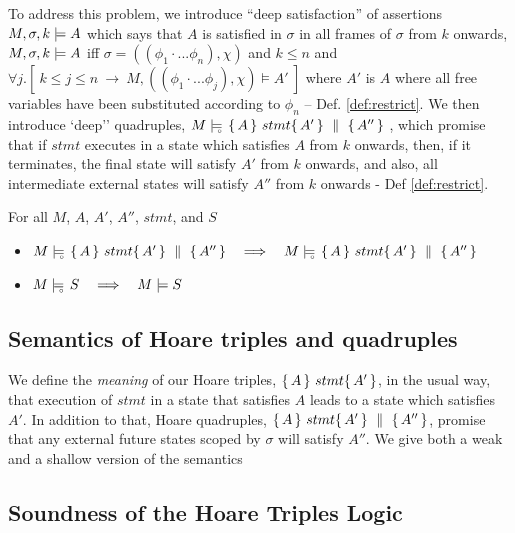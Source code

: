 To address this problem, we introduce ``deep satisfaction'' of assertions $ M,\sigma ,{k} \models {A} $ which says that $A$ is satisfied in $\sigma$  in all frames of $\sigma$ from $k$ onwards, 
\ie  $ M,\sigma ,{k} \models {A} $ iff $\sigma = ((\phi_1\cdot ... \phi_n), \chi)$ and $k\leq n$ and $\forall j. [\  k\leq j \leq n \ \rightarrow \ M, ((\phi_1\cdot ... \phi_j), \chi) \models A'\ ]$ where $A'$ is $A$ where all free variables have been substituted according to $\phi_n$ --
\cf Def. \ref{def:restrict}.
We then introduce `deep'' quadruples,   $M \models\!\!\!\!_{_{\circ}}\   \{\, A \, \}\ stmt \{\, A' \, \} \, \,\parallel\,\, \{\, A'' \, \} $ , which promise that if $stmt$ executes in a state which satisfies $A$ from $k$ onwards, then, if it terminates, the final state will satisfy $A'$ from $k$ onwards, and also, all intermediate external states will satisfy $A''$ from $k$ onwards - \cf Def \ref{def:restrict}.

\begin{lemma}
For all $M$, $A$, $A'$, $A''$, $stmt$, and $S$
\begin{itemize}
\item
 $\satisfiesD {M} {\quadruple  {A} }   {stmt}   {A'} {A''}   \ \ \ \Longrightarrow \ \ \   \satisfiesD {M} {\quadruple  {A} }   {stmt}   {A'} {A''}$
\item 
$\satisfiesD {M} {S}  \ \ \ \Longrightarrow \ \ \ \satisfies {M} {S}$
\end{itemize}
\end{lemma}



\subsection{Semantics of Hoare triples and quadruples}
\label{sect:HLmeans}

We  define the {\emph {meaning}} of  our Hoare triples, $ \{\, A \, \}\ stmt \{\, A' \, \}$,  in the usual way, \ie that execution of $stmt$ in a state that satisfies $A$ leads to a state which satisfies $A'$.  
In addition to that, Hoare quadruples, $ \{\, A \, \}\ stmt \{\, A' \, \} \, \,\parallel\,\, \{\, A'' \, \} $, promise that any external future states scoped by $\sigma$ will satisfy $A''$.
We give both a weak and a shallow version of the semantics




\subsection{Soundness of the Hoare Triples Logic}

